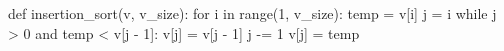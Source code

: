 \begin{unipdcode}[language=Python]
def insertion_sort(v, v_size):
    for i in range(1, v_size):
        temp = v[i]
        j = i
        while j > 0 and temp < v[j - 1]:
            v[j] = v[j - 1]
            j -= 1
        v[j] = temp
\end{unipdcode}
